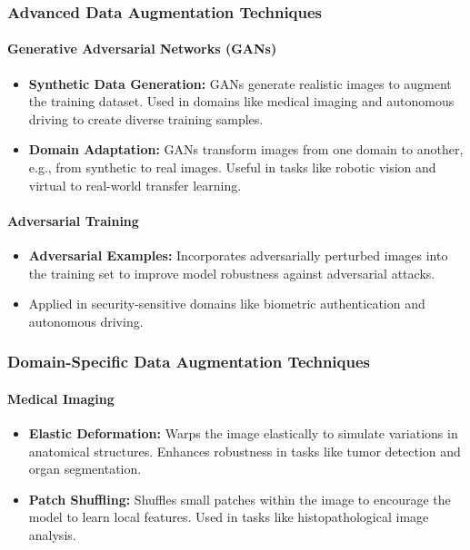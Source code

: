 \documentclass[12pt]{article}
\begin{document}
\subsubsection{Advanced Data Augmentation Techniques}

\paragraph{Generative Adversarial Networks (GANs)}
\begin{itemize}
    \item \textbf{Synthetic Data Generation:} GANs generate realistic images to augment the training dataset. Used in domains like medical imaging and autonomous driving to create diverse training samples.
    \item \textbf{Domain Adaptation:} GANs transform images from one domain to another, e.g., from synthetic to real images. Useful in tasks like robotic vision and virtual to real-world transfer learning.
\end{itemize}

\paragraph{Adversarial Training}
\begin{itemize}
    \item \textbf{Adversarial Examples:} Incorporates adversarially perturbed images into the training set to improve model robustness against adversarial attacks.
    \item Applied in security-sensitive domains like biometric authentication and autonomous driving.
\end{itemize}

\subsubsection{Domain-Specific Data Augmentation Techniques}

\paragraph{Medical Imaging}
\begin{itemize}
    \item \textbf{Elastic Deformation:} Warps the image elastically to simulate variations in anatomical structures. Enhances robustness in tasks like tumor detection and organ segmentation.
    \item \textbf{Patch Shuffling:} Shuffles small patches within the image to encourage the model to learn local features. Used in tasks like histopathological image analysis.
\end{itemize}
\end{document}
